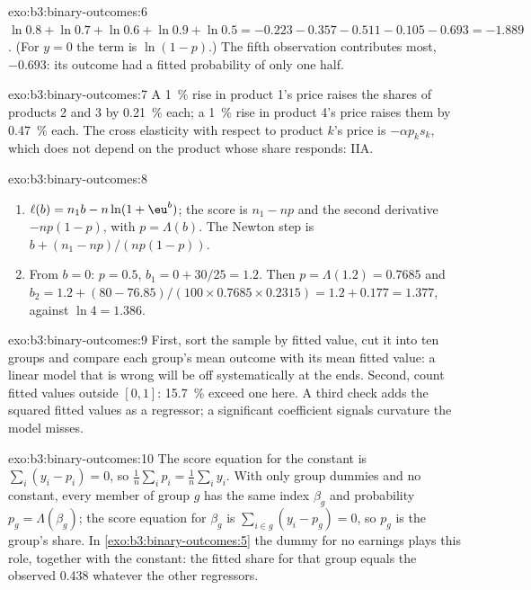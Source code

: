 \begin{solution}{exo:b3:binary-outcomes:6}
$\ln 0.8 + \ln 0.7 + \ln 0.6 + \ln 0.9 + \ln 0.5 = -0.223 - 0.357 - 0.511 - 0.105
- 0.693 = -1.889$. (For $y = 0$ the term is $\ln(1 - p)$.) The fifth observation
contributes most, $-0.693$: its outcome had a fitted probability of only one
half.
\end{solution}

\begin{solution}{exo:b3:binary-outcomes:7}
A 1~\% rise in product 1's price raises the shares of products 2 and 3 by 0.21~\%
each; a 1~\% rise in product 4's price raises them by 0.47~\% each.
The cross elasticity with respect to product $k$'s price is $-\alpha p_k s_k$, which
does not depend on the product whose share responds: IIA.
\end{solution}

\begin{solution}{exo:b3:binary-outcomes:8}
\begin{enumerate}
\item $\ell(b) = n_1 b - n\ln(1 + \eu^b)$; the score is $n_1 - np$ and the
second derivative $-np(1 - p)$, with $p = \Lambda(b)$. The Newton step is $b +
(n_1 - np)/(np(1 - p))$.
\item From $b = 0$: $p = 0.5$, $b_1 = 0 + 30/25 = 1.2$. Then $p = \Lambda(1.2) =
0.7685$ and $b_2 = 1.2 + (80 - 76.85)/(100 \times 0.7685 \times 0.2315) = 1.2 +
0.177 = 1.377$, against $\ln 4 = 1.386$.
\end{enumerate}
\end{solution}

\begin{solution}{exo:b3:binary-outcomes:9}
First, sort the sample by fitted value, cut it into ten groups and compare each
group's mean outcome with its mean fitted value: a linear model that is wrong
will be off systematically at the ends. Second, count fitted values outside
$[0, 1]$: 15.7~\% exceed one here. %
A third check adds the squared fitted values as a regressor; a significant
coefficient signals curvature the model misses.
\end{solution}

\begin{solution}{exo:b3:binary-outcomes:10}
The score equation for the constant is $\sum_i (y_i - p_i) = 0$, so $\frac1n\sum_i
p_i = \frac1n\sum_i y_i$. With only group dummies and no constant, every member
of group $g$ has the same index $\beta_g$ and probability $p_g = \Lambda(\beta_g)$;
the score equation for $\beta_g$ is $\sum_{i \in g} (y_i - p_g) = 0$, so $p_g$ is
the group's share. In \cref{exo:b3:binary-outcomes:5} the dummy for no earnings
plays this role, together with the constant: the fitted share for that group
equals the observed 0.438 whatever the other regressors.
\end{solution}

